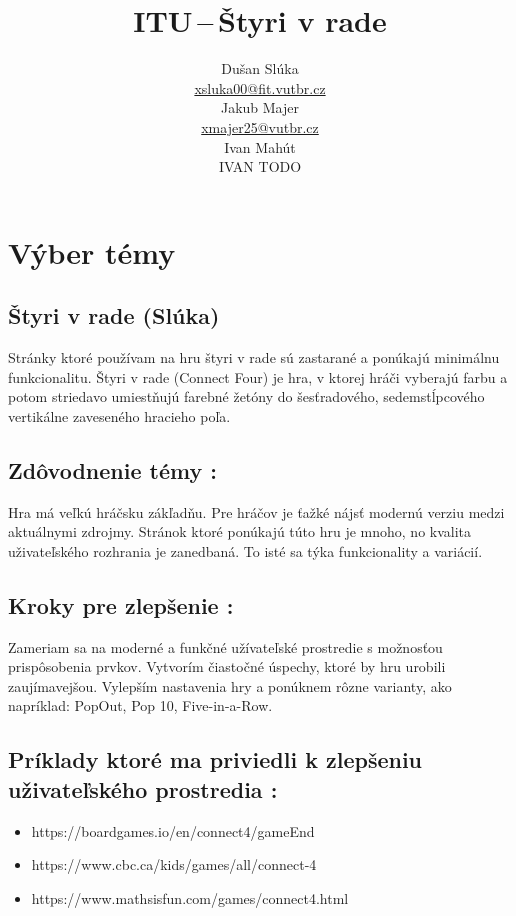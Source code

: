 \documentclass[a4paper, 11pt, onecolumn]{article}
\title{ITU\,--\,Štyri v rade}
\author{Dušan Slúka \\ \href{mailto:xsluka00@fit.vutbr.cz}{xsluka00@fit.vutbr.cz}\\
        Jakub Majer \\ \href{xmajer25@vutbr.cz}{xmajer25@vutbr.cz}\\
        Ivan Mahút \\ IVAN TODO}
\date{}
\begin{document}
\maketitle

\section{Výber témy}
\subsection{Štyri v rade (Slúka)}
Stránky ktoré používam na hru štyri v rade sú zastarané a ponúkajú minimálnu funkcionalitu.
Štyri v rade (Connect Four) je hra, v ktorej hráči vyberajú farbu a potom striedavo umiestňujú farebné 
žetóny do šesťradového, sedemstĺpcového vertikálne zaveseného hracieho poľa. 


\subsection*{Zdôvodnenie témy :} 
  Hra má veľkú hráčsku zákľadňu. Pre hráčov je ťažké nájsť modernú verziu medzi aktuálnymi zdrojmy. Stránok ktoré
ponúkajú túto hru je mnoho, no kvalita uživateľského rozhrania je zanedbaná. To isté sa týka funkcionality a variácií.

\subsection*{Kroky pre zlepšenie :} 
Zameriam sa na moderné a funkčné užívateľské prostredie s možnosťou prispôsobenia prvkov. 
Vytvorím čiastočné úspechy, ktoré by hru urobili zaujímavejšou. 
Vylepším nastavenia hry a ponúknem rôzne varianty, ako napríklad: PopOut, Pop 10, Five-in-a-Row.
\subsection*{Príklady ktoré ma priviedli k zlepšeniu uživateľského prostredia :} 
\begin{itemize}
  \item https://boardgames.io/en/connect4/gameEnd
  \item https://www.cbc.ca/kids/games/all/connect-4
  \item https://www.mathsisfun.com/games/connect4.html
\end{itemize}
\end{document}
